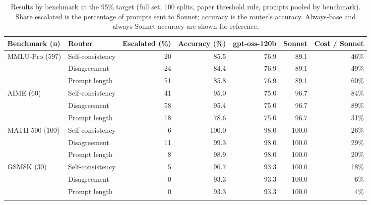 \begin{table}[!htbp]
\centering\small
\caption{Results by benchmark at the 95\% target (full set, 100 splits, paper threshold rule, prompts pooled by benchmark). Share escalated is the percentage of prompts sent to Sonnet; accuracy is the router's accuracy. Always-base and always-Sonnet accuracy are shown for reference.}\label{tab:bench}
\begin{tabular}{llrrrrr}
\toprule
Benchmark (n) & Router & Escalated (\%) & Accuracy (\%) & gpt-oss-120b & Sonnet & Cost / Sonnet \\
\midrule
MMLU-Pro (597) & Self-consistency & 20 & 85.5 & 76.9 & 89.1 & 46\% \\
 & Disagreement & 24 & 84.4 & 76.9 & 89.1 & 49\% \\
 & Prompt length & 51 & 85.8 & 76.9 & 89.1 & 60\% \\
\addlinespace
AIME (60) & Self-consistency & 41 & 95.0 & 75.0 & 96.7 & 84\% \\
 & Disagreement & 58 & 95.4 & 75.0 & 96.7 & 89\% \\
 & Prompt length & 18 & 78.6 & 75.0 & 96.7 & 31\% \\
\addlinespace
MATH-500 (100) & Self-consistency & 6 & 100.0 & 98.0 & 100.0 & 26\% \\
 & Disagreement & 11 & 99.3 & 98.0 & 100.0 & 29\% \\
 & Prompt length & 8 & 98.9 & 98.0 & 100.0 & 20\% \\
\addlinespace
GSM8K (30) & Self-consistency & 5 & 96.7 & 93.3 & 100.0 & 18\% \\
 & Disagreement & 0 & 93.3 & 93.3 & 100.0 & 6\% \\
 & Prompt length & 0 & 93.3 & 93.3 & 100.0 & 4\% \\
\addlinespace
\bottomrule
\end{tabular}
\end{table}
